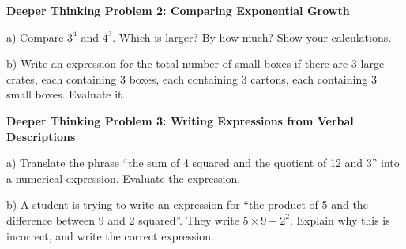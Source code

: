 \documentclass[12pt, letterpaper, fleqn]{article}
\begin{document}
\vspace{4mm}

\begin{tcolorbox}[colback=white, colframe=black, boxrule=1pt, arc=4mm, left=6mm, right=6mm, top=5mm, bottom=5mm]
\textbf{Deeper Thinking Problem 2: Comparing Exponential Growth}

\medskip

\noindent
a) Compare $3^4$ and $4^3$. Which is larger? By how much? Show your calculations.

\vspace{3cm}

\noindent
b) Write an expression for the total number of small boxes if there are 3 large crates, each containing 3 boxes, each containing 3 cartons, each containing 3 small boxes. Evaluate it.

\vspace{3cm}
\end{tcolorbox}
\vspace{0.5cm}
\begin{tcolorbox}[colback=white, colframe=black, boxrule=1pt, arc=4mm, left=6mm, right=6mm, top=5mm, bottom=5mm]
\textbf{Deeper Thinking Problem 3: Writing Expressions from Verbal Descriptions}

\medskip

\noindent
a) Translate the phrase ``the sum of 4 squared and the quotient of 12 and 3'' into a numerical expression. Evaluate the expression.

\vspace{3cm}

\noindent
b) A student is trying to write an expression for ``the product of 5 and the difference between 9 and 2 squared''. They write $5 \times 9 - 2^2$. Explain why this is incorrect, and write the correct expression.

\vspace{3cm}
\end{tcolorbox}
\newpage
\end{document}
